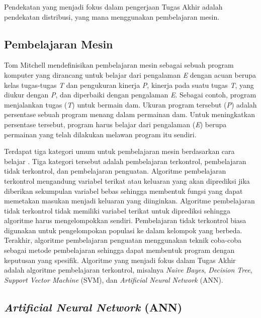 Pendekatan yang menjadi fokus dalam pengerjaan Tugas Akhir adalah pendekatan distribusi, yang mana menggunakan pembelajaran mesin.

\subsection{Pembelajaran Mesin}

Tom Mitchell \parencite{mitchell1997machine} mendefinisikan pembelajaran mesin sebagai sebuah program komputer yang dirancang untuk belajar dari pengalaman \textit{E} dengan acuan berupa kelas tugas-tugas \textit{T} dan pengukuran kinerja \textit{P}, kinerja pada suatu tugas \textit{T}, yang diukur dengan \textit{P}, dan diperbaiki dengan pengalaman \textit{E}. Sebagai contoh, program menjalankan tugas (\textit{T}) untuk bermain dam. Ukuran program tersebut (\textit{P}) adalah persentase sebuah program menang dalam permainan dam. Untuk meningkatkan persentase tersebut, program harus belajar dari pengalaman (\textit{E}) berupa permainan yang telah dilakukan melawan program itu sendiri.

Terdapat tiga kategori umum untuk pembelajaran mesin berdasarkan cara belajar \parencite{ray2015essentials}. Tiga kategori tersebut adalah pembelajaran terkontrol, pembelajaran tidak terkontrol, dan pembelajaran penguatan. Algoritme pembelajaran terkontrol mengandung variabel terikat atau keluaran yang akan diprediksi jika diberikan sekumpulan variabel bebas sehingga membentuk fungsi yang dapat memetakan masukan menjadi keluaran yang diinginkan. Algoritme pembelajaran tidak terkontrol tidak memiliki variabel terikat untuk diprediksi sehingga algoritme harus mengelompokkan sendiri. Pembelajaran tidak terkontrol biasa digunakan untuk pengelompokan populasi ke dalam kelompok yang berbeda. Terakhir, algoritme pembelajaran penguatan menggunakan teknik coba-coba sebagai metode pembelajaran sehingga dapat membentuk program dengan keputusan yang spesifik. Algoritme yang menjadi fokus dalam Tugas Akhir adalah algoritme pembelajaran terkontrol, misalnya \textit{Naive Bayes}, \textit{Decision Tree}, \textit{Support Vector Machine} (SVM), dan \textit{Artificial Neural Network} (ANN).

\subsection{\textit{Artificial Neural Network} (ANN)}

